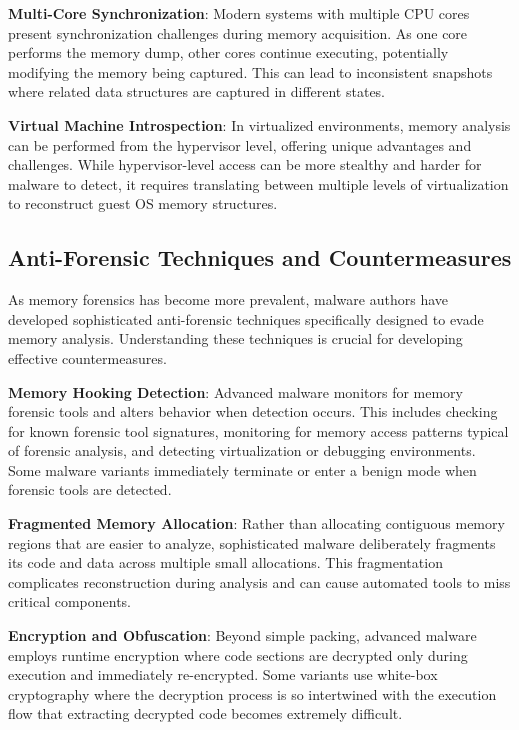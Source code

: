 \textbf{Multi-Core Synchronization}: Modern systems with multiple CPU cores present synchronization challenges during memory acquisition. As one core performs the memory dump, other cores continue executing, potentially modifying the memory being captured. This can lead to inconsistent snapshots where related data structures are captured in different states.

\textbf{Virtual Machine Introspection}: In virtualized environments, memory analysis can be performed from the hypervisor level, offering unique advantages and challenges. While hypervisor-level access can be more stealthy and harder for malware to detect, it requires translating between multiple levels of virtualization to reconstruct guest OS memory structures.

\subsection{Anti-Forensic Techniques and Countermeasures}
\label{subsec:anti_forensic}

As memory forensics has become more prevalent, malware authors have developed sophisticated anti-forensic techniques specifically designed to evade memory analysis. Understanding these techniques is crucial for developing effective countermeasures.

\textbf{Memory Hooking Detection}: Advanced malware monitors for memory forensic tools and alters behavior when detection occurs. This includes checking for known forensic tool signatures, monitoring for memory access patterns typical of forensic analysis, and detecting virtualization or debugging environments. Some malware variants immediately terminate or enter a benign mode when forensic tools are detected.

\textbf{Fragmented Memory Allocation}: Rather than allocating contiguous memory regions that are easier to analyze, sophisticated malware deliberately fragments its code and data across multiple small allocations. This fragmentation complicates reconstruction during analysis and can cause automated tools to miss critical components.

\textbf{Encryption and Obfuscation}: Beyond simple packing, advanced malware employs runtime encryption where code sections are decrypted only during execution and immediately re-encrypted. Some variants use white-box cryptography where the decryption process is so intertwined with the execution flow that extracting decrypted code becomes extremely difficult.

